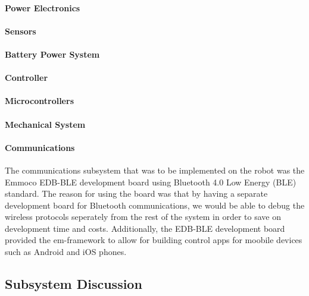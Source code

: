 \documentclass[11pt]{report}
\begin{document}
\begin{spacing}{1.5}
        \paragraph{Power Electronics}
        
        \paragraph{Sensors}
        
        \paragraph{Battery Power System}
        
        \paragraph{Controller}
        
        \paragraph{Microcontrollers}
        
        \paragraph{Mechanical System}
        
        \paragraph{Communications}
        
        The communications subsystem that was to be implemented on the robot was the Emmoco EDB-BLE development board using Bluetooth 4.0 Low Energy (BLE) standard. The reason for using the board was that by having a separate development board for Bluetooth\textsuperscript{\textregistered} communications, we would be able to debug the wireless protocols seperately from the rest of the system in order to save on development time and costs. Additionally, the EDB-BLE development board provided the em-framework to allow for building control apps for moobile devices such as Android and iOS phones.
        

    \subsection*{Subsystem Discussion}
    

\end{spacing}
\end{document}
